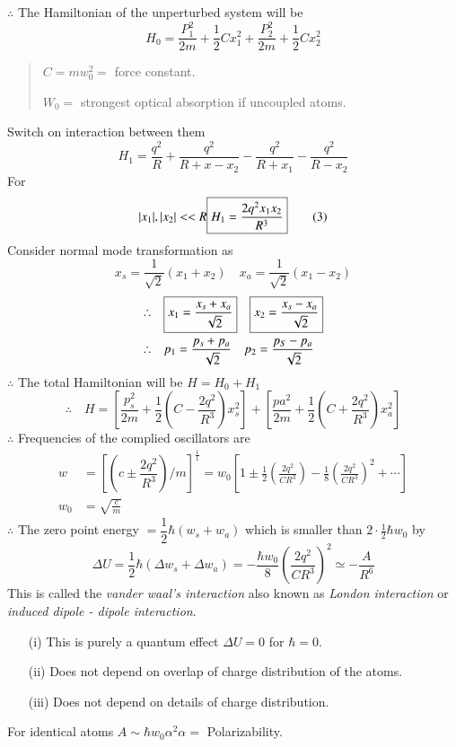 $\therefore$ The Hamiltonian of the unperturbed system will be
\begin{equation*}
H_{0}=\dfrac{P^{2}_{1}}{2m}+\frac{1}{2}Cx^{2}_{1}+\dfrac{P^{2}_{2}}{2m}+\frac{1}{2}Cx^{2}_{2}\tag{1}\label{lec15-eq1}
\end{equation*}
\begin{quote}
$C=mw^{2}_{0} =$ force constant.

$W_{0} =$ strongest optical absorption if uncoupled atoms.
\end{quote}
Switch on interaction between them
\begin{equation*}
H_{1}=\dfrac{q^{2}}{R}+\frac{q^{2}}{R+x-x_{2}}-\frac{q^{2}}{R+x_{1}}-\frac{q^{2}}{R-x_{2}}\tag{2}\label{lec15-eq2}
\end{equation*}
For
\begin{equation*}
|x_{1}|,|x_{2}|<< R \fbox{$H_{1}=\dfrac{2q^{2}x_{1}x_{2}}{R^{3}}$}\tag{3}\label{lec15-eq3}
\end{equation*}
Consider normal mode transformation as
\begin{equation*}
x_{s}=\dfrac{1}{\sqrt{2}}(x_{1}+x_{2})\quad x_{a}=\dfrac{1}{\sqrt{2}}(x_{1}-x_{2})\tag{4}\label{lec15-eq4}
\end{equation*}
\begin{align*}
\therefore\quad &\fbox{$x_{1}=\dfrac{x_{s}+x_{a}}{\sqrt{2}}$}\quad \fbox{$x_{2}=\dfrac{x_{s}-x_{a}}{\sqrt{2}}$}\\
\therefore\quad &p_{1}=\dfrac{p_{s}+p_{a}}{\sqrt{2}}\quad p_{2}=\dfrac{p_{S}-p_{a}}{\sqrt{2}}
\end{align*}
$\therefore$ The total Hamiltonian will be $H=H_{0}+H_{1}$
$$
\therefore\quad H=\left[\dfrac{p^{2}_{s}}{2m}+\frac{1}{2}\left(C-\frac{2q^{2}}{R^{3}}\right)x^{2}_{s}\right]+\left[\frac{pa^{2}}{2m}+\dfrac{1}{2}\left(C+\frac{2q^{2}}{R^{3}}\right)x^{2}_{a}\right]
$$
$\therefore$ Frequencies of the complied oscillators are
\begin{align*}
w &= \left[\left(c\pm \dfrac{2q^{2}}{R^{3}}\right)/m\right]^{\frac{1}{1}}=w_{0}\left[1\pm \frac{1}{2}\left(\frac{2q^{2}}{CR^{3}}\right)-\frac{1}{8}\left(\frac{2q^{2}}{CR^{3}}\right)^{2}+\cdots\right]\\
w_{0} &= \sqrt{\frac{c}{m}}
\end{align*}
$\therefore$ The zero point energy $=\dfrac{1}{2}\hbar(w_{s}+w_{a})$ which is smaller than $2\cdot \frac{1}{2}\hbar w_{0}$ by
$$
\Delta U=\frac{1}{2}\hbar (\Delta w_{s}+\Delta w_{a})=-\dfrac{\hbar w_{0}}{8}\left(\frac{2q^{2}}{CR^{3}}\right)^{2}\simeq -\frac{A}{R^{6}}
$$
This is called the {\em vander waal's interaction} also known as {\em London interaction} or {\em induced dipole - dipole interaction}.
\begin{itemize}
\item[(i)] This is purely a quantum effect $\Delta U=0$ for $\hbar=0$.

\item[(ii)] Does not depend on overlap of charge distribution of the atoms.

\item[(iii)] Does not depend on details of charge distribution.
\end{itemize}
For identical atoms $A\sim \hbar w_{0}\alpha^{2}$\quad $\alpha=$ Polarizability.

